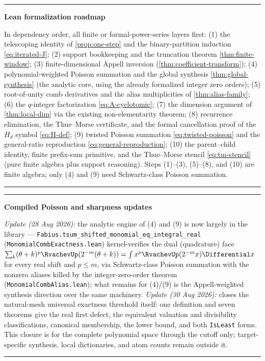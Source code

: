 \documentclass[11pt,oneside]{article}
\numberwithin{equation}{section}
\theoremstyle{definition}
\theoremstyle{remark}
\newenvironment{statusbox}[1]{%
  \par\smallskip\noindent\begin{center}\begin{minipage}{0.94\textwidth}%
  \hrule\vspace{0.5em}\noindent\textbf{#1}\par\smallskip
}{%
  \vspace{0.5em}\hrule\end{minipage}\end{center}\smallskip
}
\begin{document}
\begin{statusbox}{Lean formalization roadmap}
In dependency order, all finite or formal-power-series layers first:
(1) the telescoping identity of \cref{prop:one-step} and the
binary-partition induction \eqref{eq:iterated-J};
(2) support bookkeeping and the truncation theorem
\cref{thm:finite-window}; (3) finite-dimensional Appell inversion
(\cref{thm:coefficient-transform});
(4) polynomial-weighted Poisson summation and the global synthesis
\cref{thm:global-synthesis} (the analytic core, using the already
formalized integer zero orders);
(5) root-of-unity comb derivatives and the alias multiplicities of
\cref{thm:alias-family}; (6) the $q$-integer factorization
\eqref{eq:A-cyclotomic}; (7) the dimension argument of
\cref{thm:local-dim} via the existing non-elementarity theorem;
(8) recurrence elimination, the Thue--Morse certificate, and the
formal cancellation proof of the $H_d$ symbol
\eqref{eq:H-def}; (9) twisted Poisson summation
\eqref{eq:twisted-poisson} and the general-ratio reproduction
\eqref{eq:general-reproduction}; (10) the parent--child identity,
finite prefix-sum primitive, and the Thue--Morse stencil
\eqref{eq:tm-stencil} (pure finite algebra plus support
reasoning).  Steps (1)--(3), (5)--(8), and (10) are finite
algebra; only (4) and (9) need Schwartz-class Poisson summation.
\end{statusbox}

\begin{statusbox}{Compiled Poisson and sharpness updates}
\emph{Update (28 Aug 2026):} the analytic engine of (4) and (9) is
now largely in the library ---
\nolinkurl{Fabius.tsum_shifted_monomial_eq_integral_real}
(\nolinkurl{MonomialCombExactness.lean}) kernel-verifies the dual
(quadrature) face
$\sum_{k}(\theta+k)^{p}\RvachevUp(2^{-m}(\theta+k))
=\int x^{p}\RvachevUp(2^{-m}x)\Differential x$ for every real shift and $p\le m$,
via Schwartz-class Poisson summation with the nonzero aliases killed
by the integer-zero-order theorem
(\nolinkurl{MonomialCombAlias.lean}); what remains for (4)/(9) is
the Appell-weighted synthesis direction over the same machinery.
\emph{Update (30 Aug 2026):}  closes
the natural-mesh universal exactness threshold itself: one definition and
seven theorems give the real first defect, the equivalent valuation and
divisibility classifications, canonical membership, the lower bound, and both
\texttt{IsLeast} forms.  This closure is for the complete polynomial space
through the cutoff only; target-specific synthesis, local dictionaries, and
atom counts remain outside it.
\end{statusbox}
\end{document}
